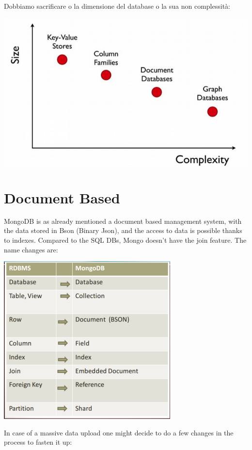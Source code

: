 \documentclass[a4page, 11pt]{article}
\begin{document}
Dobbiamo sacrificare o la dimensione del database o la sua non complessità:
\begin{center}
	\includegraphics[scale=0.5]{IMAGE1.jpg}
\end{center}



\section{Document Based\cite{MongoDB}}
MongoDB is as already mentioned a document based management system, with the data stored in Bson (Binary Json), and the access to data is possible thanks to indexes. Compared to the SQL DBs, Mongo doesn't have the join feature. The name changes are:

\begin{center}
	\includegraphics[scale=0.6]{IMAGE2.jpg}
\end{center}

In case of a massive data upload one might decide to do a few changes in the process to fasten  it up:
\end{document}
